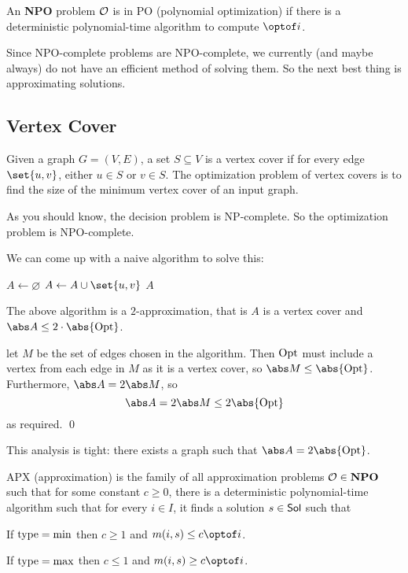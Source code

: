 \bdefn

    An {\bf NPO} problem ${\cal O}$ is in {\emphcolor PO} (polynomial optimization) if there is a deterministic polynomial-time algorithm to compute $\optof i$.

\edefn

Since NPO-complete problems are NPO-complete, we currently (and maybe always) do not have an efficient method of solving them.
So the next best thing is approximating solutions.

\subsection{Vertex Cover}

\bprob

    Given a graph $G=(V,E)$, a set $S\subseteq V$ is a {\emphcolor vertex cover} if for every edge $\set{u,v}$, either $u\in S$ or $v\in S$.
    The optimization problem of vertex covers is to find the size of the minimum vertex cover of an input graph.

\eprob

As you should know, the decision problem is NP-complete.
So the optimization problem is NPO-complete.

We can come up with a naive algorithm to solve this:

\algorithm
        \State $A\gets\varnothing$
            \State $A\gets A\cup\set{u,v}$
        \EndWhile
        \State \Return $A$
    \EndFunc
\ealgorithm

\bthrm

    The above algorithm is a $2$-approximation, that is $A$ is a vertex cover and $\abs A\leq2\cdot\abs{\rm Opt}$.

\ethrm

\Proof let $M$ be the set of edges chosen in the algorithm.
Then ${\rm Opt}$ must include a vertex from each edge in $M$ as it is a vertex cover, so $\abs M\leq\abs{\rm Opt}$.
Furthermore, $\abs A=2\abs M$, so
$$ \abs A = 2\abs M \leq 2\abs{\rm Opt} $$
as required.
\qed

This analysis is tight: there exists a graph such that $\abs A=2\abs{\rm Opt}$.

\bdefn

    {\emphcolor APX} (approximation) is the family of all approximation problems ${\cal O}\in{\bf NPO}$ such that for some constant $c\geq0$, there is a deterministic polynomial-time algorithm such that for
    every $i\in I$, it finds a solution $s\in{\sf Sol}$ such that
    \benum
        \item If ${\rm type}=\min$ then $c\geq1$ and $m(i,s)\leq c\optof i$.
        \item If ${\rm type}=\max$ then $c\leq1$ and $m(i,s)\geq c\optof i$.
    \eenum

